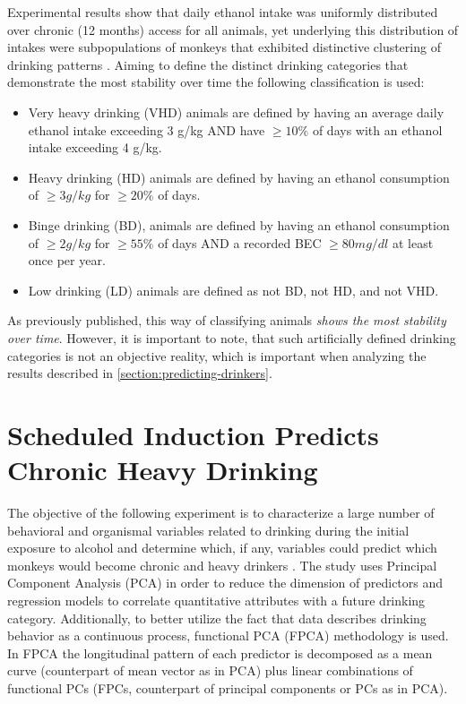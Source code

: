 Experimental results show that daily ethanol intake was uniformly distributed over chronic (12 months) access for all animals, yet underlying this distribution of intakes were subpopulations of monkeys that exhibited distinctive clustering of drinking patterns . Aiming to define the distinct drinking categories that demonstrate the most stability over time the following classification is used:
\begin{itemize}
	\item Very heavy drinking (VHD) animals are defined by having an average daily ethanol intake exceeding 3 g/kg AND have $\ge 10\%$ of days with an ethanol intake exceeding 4 g/kg.
	\item Heavy drinking (HD) animals are defined by having an ethanol consumption of $\ge 3 g/kg$ for $\ge 20\%$ of days.
	\item Binge drinking (BD), animals are defined by having an ethanol consumption of $\ge 2 g/kg$ for $\ge 55\%$ of days	AND	a recorded BEC $\ge 80 mg/dl$ at least once per year.
	\item Low drinking (LD) animals are defined as not BD, not HD, and not VHD.
\end{itemize} 

As previously published, this way of classifying animals \textit{shows the most stability over time}. However, it is important to note, that such artificially defined drinking categories is not an objective reality, which is important when analyzing the results described in \cref{section:predicting-drinkers}.


\section{Scheduled Induction Predicts Chronic Heavy Drinking}
The objective of the following experiment is to characterize a large number of behavioral and organismal variables related to drinking during the initial exposure to alcohol and determine which, if any, variables could predict which monkeys would become chronic and heavy drinkers . The study uses Principal Component Analysis (PCA) in order to reduce the dimension of predictors and regression models to correlate quantitative attributes with a future drinking category. Additionally, to better utilize the fact that data describes drinking behavior as a continuous process, functional PCA (FPCA) methodology is used. In FPCA the longitudinal pattern of each predictor is decomposed as a mean curve (counterpart of mean vector as in PCA) plus linear combinations of functional PCs (FPCs, counterpart of principal components or PCs as in PCA).

